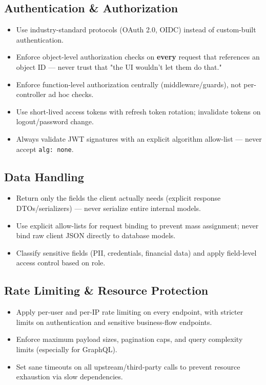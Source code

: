 \documentclass[11pt]{article}
\begin{document}
\subsection{Authentication \& Authorization}
\begin{itemize}
  \item Use industry-standard protocols (OAuth 2.0, OIDC) instead of custom-built authentication.
  \item Enforce object-level authorization checks on \textbf{every} request that references an object ID --- never trust that "the UI wouldn't let them do that."
  \item Enforce function-level authorization centrally (middleware/guards), not per-controller ad hoc checks.
  \item Use short-lived access tokens with refresh token rotation; invalidate tokens on logout/password change.
  \item Always validate JWT signatures with an explicit algorithm allow-list --- never accept \texttt{alg: none}.
\end{itemize}

\subsection{Data Handling}
\begin{itemize}
  \item Return only the fields the client actually needs (explicit response DTOs/serializers) --- never serialize entire internal models.
  \item Use explicit allow-lists for request binding to prevent mass assignment; never bind raw client JSON directly to database models.
  \item Classify sensitive fields (PII, credentials, financial data) and apply field-level access control based on role.
\end{itemize}

\subsection{Rate Limiting \& Resource Protection}
\begin{itemize}
  \item Apply per-user and per-IP rate limiting on every endpoint, with stricter limits on authentication and sensitive business-flow endpoints.
  \item Enforce maximum payload sizes, pagination caps, and query complexity limits (especially for GraphQL).
  \item Set sane timeouts on all upstream/third-party calls to prevent resource exhaustion via slow dependencies.
\end{itemize}
\end{document}
